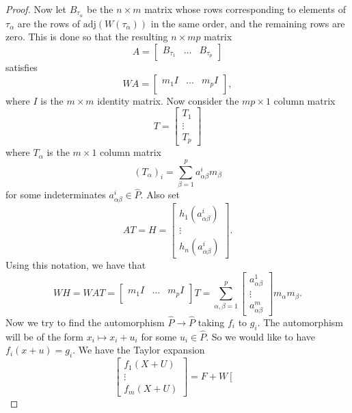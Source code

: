 \documentclass{article}
\theoremstyle{definition}
\theoremstyle{plain}
\theoremstyle{remark}
\newcommand{\adj}{\mathrm{adj}}
\begin{document}
\begin{proof}
		Now let $B_{\tau_\alpha}$ be the $n\times m$ matrix whose rows corresponding to elements of $\tau_\alpha$ are the rows of $\adj(W(\tau_\alpha))$ in the same order, and the remaining rows are zero. This is done so that the resulting $n\times mp$ matrix
		\[A = \left[\begin{array}{c|c|c}
			B_{\tau_1}&\ldots&B_{\tau_p}
		\end{array}\right]\]
		satisfies 
		\[WA = \left[\begin{array}{c|c|c}
			m_1I&\ldots&m_pI\\
		\end{array}\right],\]
		where $I$ is the $m\times m$ identity matrix. Now consider the $mp\times 1$ column matrix
		\[T = \left[\begin{array}{c}
			T_1\\ \hline
			\vdots \\ \hline
			T_p
		\end{array}\right]\]
		where $T_\alpha$ is the $m\times 1$ column matrix
		\[(T_\alpha)_i= \sum_{\beta=1}^p a^i_{\alpha\beta}m_\beta\]
		for some indeterminates $a^i_{\alpha\beta}\in \widehat{P}$. Also set 
		\[AT = H = \left[\begin{array}{c}
			h_1(a^i_{\alpha\beta})\\
			\vdots\\
			h_n(a^i_{\alpha\beta})
		\end{array}\right].\]
		Using this notation, we have that 
		\[WH = WAT = \left[\begin{array}{c|c|c}
			m_1I&\ldots&m_pI\\
		\end{array}\right] T = \sum_{\alpha, \beta = 1}^p \left[\begin{array}{c}
			a^1_{\alpha\beta}\\
			\vdots\\
			a^m_{\alpha\beta}
		\end{array}\right]m_{\alpha}m_{\beta}.\tag{$\dagger\dagger$}\]
		Now we try to find the automorphism $\widehat{P}\to \widehat{P}$ taking $f_i$ to $g_i$. The automorphism will be of the form $x_i \mapsto x_i + u_i$ for some $u_i\in \widehat{P}$. So we would like to have $f_i(x + u) = g_i$. We have the Taylor expansion
		\[\left[\begin{array}{c}
			f_1(X + U)\\
			\vdots\\
			f_m(X + U)
		\end{array}\right] = F + W\left[\begin{array}{c}

\end{array}\]
\end{proof}
\end{document}
